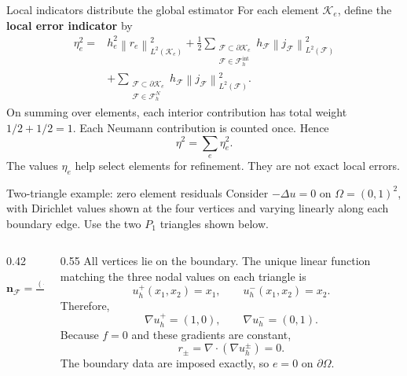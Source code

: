\documentclass[11pt,aspectratio=169]{beamer}
\newcommand{\Om}{\Omega}
\newcommand{\Fh}{\mathcal F_h}
\newcommand{\norm}[2][]{\left\lVert#2\right\rVert_{#1}}
\newcommand{\grad}{\nabla}
\newcommand{\divg}{\nabla\!\cdot}
\newcommand{\bn}{\bm n}
\begin{document}
\begin{frame}{Local indicators distribute the global estimator}
For each element $\mathcal K_e$, define the \textbf{local error indicator} by
\[
\boxed{
\begin{aligned}
\eta_e^2={}&h_e^2\norm[L^2(\mathcal K_e)]{r_e}^2
+\frac12\sum_{\substack{\mathcal F\subset\partial\mathcal K_e\\
\mathcal F\in\Fh^{\mathrm{int}}}}
h_{\mathcal F}\norm[L^2(\mathcal F)]{j_{\mathcal F}}^2\\
&+\sum_{\substack{\mathcal F\subset\partial\mathcal K_e\\
\mathcal F\in\Fh^N}}
h_{\mathcal F}\norm[L^2(\mathcal F)]{j_{\mathcal F}}^2.
\end{aligned}
}
\]
On summing over elements, each interior contribution has total weight
$1/2+1/2=1$. Each Neumann contribution is counted once. Hence
\[
  \eta^2=\sum_e\eta_e^2.
\]
The values $\eta_e$ help select elements for refinement. They are not exact
local errors.
\end{frame}

\begin{frame}{Two-triangle example: zero element residuals}
\small
Consider $-\Delta u=0$ on $\Om=(0,1)^2$, with Dirichlet values shown at
the four vertices and varying linearly along each boundary edge. Use the
two $P_1$ triangles shown below.

\begin{columns}[T,onlytextwidth]
\begin{column}{0.42\textwidth}
\centering
{}

\vspace{0.1cm}
$\displaystyle \bn_{\mathcal F}=\frac{(-1,1)}{\sqrt2}$
\end{column}
\begin{column}{0.55\textwidth}
All vertices lie on the boundary. The unique linear function matching
the three nodal values on each triangle is
\[
  u_h^+(x_1,x_2)=x_1,
  \qquad
  u_h^-(x_1,x_2)=x_2.
\]
Therefore,
\[
  \grad u_h^+=(1,0),
  \qquad
  \grad u_h^-=(0,1).
\]
Because $f=0$ and these gradients are constant,
\[
  r_\pm=\divg(\grad u_h^\pm)=0.
\]
The boundary data are imposed exactly, so $e=0$ on $\partial\Om$.
\end{column}
\end{columns}
\end{frame}
\end{document}
